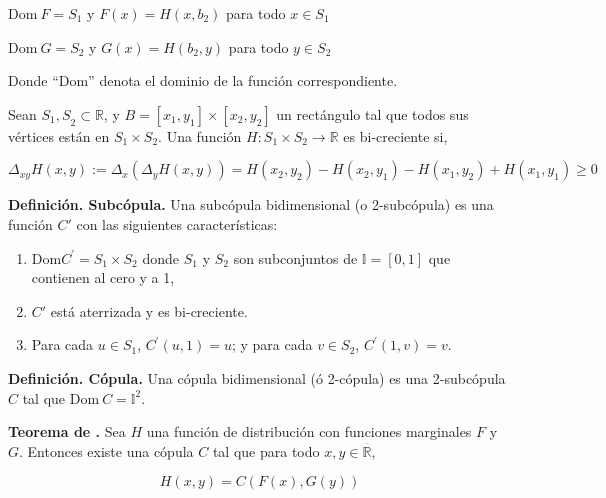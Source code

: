 \(\mathrm{\text{Dom}}\ F = S_{1}\) y \(F\left( x \right) = H\left( x,b_{2} \right)\) para todo \(x \in S_{1}\)

\(\mathrm{\text{Dom}}\ G = S_{2}\) y
\(G\left( x \right) = H\left( b_{2},y \right)\) para todo
\(y \in S_{2}\)

\noindent
Donde ``\(\mathrm{\text{Dom}}\)'' denota el dominio de la funci\'on
correspondiente.

Sean \({S_{1},S}_{2} \subset \overset{\overline{}}{\mathbb{R}}\), y
\(B = \left\lbrack x_{1},y_{1} \right\rbrack \times \left\lbrack x_{2},y_{2} \right\rbrack\)
un rect\'angulo tal que todos sus v\'ertices est\'an en \(S_{1} \times S_{2}\). Una funci\'on \(H:S_{1} \times S_{2}\mathbb{\rightarrow R}\) es bi-creciente si,

\begin{equation}
    \Delta_{xy}H(x,y) := \Delta_{x} \left(\Delta_{y}H(x,y)\right)
    = H(x_2,y_2) - H(x_2,y_1) - H(x_1, y_2) + H(x_1, y_1) \ge 0
	\label{eq:monotoneContstraint2D}
\end{equation}

\textbf{Definici\'on. Subc\'opula.} Una subc\'opula bidimensional (o 2-subc\'opula) es una funci\'on \(C'\) con las siguientes caracter\'isticas:

\begin{enumerate}
\item
  \(\mathrm{\text{Dom}}C^{'} = S_{1} \times S_{2}\) donde \(S_{1}\) y
  \(S_{2}\) son subconjuntos de  \(\mathbb{I =}\left\lbrack 0,1 \right\rbrack\) que contienen al cero y a 1,
\item
  \(C'\) est\'a aterrizada y es bi-creciente.
\item
  Para cada \(u \in S_{1}\), \(C^{'}\left( u,1 \right) = u\); y para
  cada \(v \in S_{2}\), \(C^{'}\left( 1,v \right) = v\).
\end{enumerate}

\textbf{Definici\'on. C\'opula.} Una c\'opula bidimensional (\'o 2-c\'opula) es una 2-subc\'opula \(C\) tal que \(\mathrm{\text{Dom}}\ C = \mathbb{I}^{2}\).

\textbf{Teorema de \cite{sklar_fonctions_1959}.} Sea \(H\) una funci\'on de distribuci\'on con funciones marginales \(F\) y \(G\). Entonces existe una c\'opula \(C\) tal que para todo \(x,y \in \overset{\overline{}}{\mathbb{R}}\),

\begin{equation}
	H(x,y) = C(F(x),G(y))
	\label{eq:sklarTheorem}
\end{equation}

